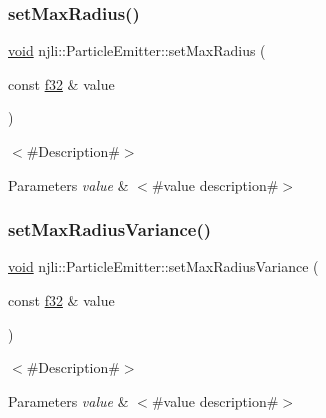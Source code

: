 \subsubsection{\texorpdfstring{set\+Max\+Radius()}{setMaxRadius()}}
{\footnotesize\ttfamily \mbox{\hyperlink{_thread_8h_af1e856da2e658414cb2456cb6f7ebc66}{void}} njli\+::\+Particle\+Emitter\+::set\+Max\+Radius (\begin{DoxyParamCaption}\item[{const \mbox{\hyperlink{_util_8h_a5f6906312a689f27d70e9d086649d3fd}{f32}} \&}]{value }\end{DoxyParamCaption})}

$<$\#\+Description\#$>$


\begin{DoxyParams}{Parameters}
{\em value} & $<$\#value description\#$>$ \\
\hline
\end{DoxyParams}
\mbox{\label{classnjli_1_1_particle_emitter_acaebc8c8b81d8cf62ad30463c68f4a8c}} 
\subsubsection{\texorpdfstring{set\+Max\+Radius\+Variance()}{setMaxRadiusVariance()}}
{\footnotesize\ttfamily \mbox{\hyperlink{_thread_8h_af1e856da2e658414cb2456cb6f7ebc66}{void}} njli\+::\+Particle\+Emitter\+::set\+Max\+Radius\+Variance (\begin{DoxyParamCaption}\item[{const \mbox{\hyperlink{_util_8h_a5f6906312a689f27d70e9d086649d3fd}{f32}} \&}]{value }\end{DoxyParamCaption})}

$<$\#\+Description\#$>$


\begin{DoxyParams}{Parameters}
{\em value} & $<$\#value description\#$>$ \\
\hline
\end{DoxyParams}
\mbox{\label{classnjli_1_1_particle_emitter_af2524c76c57fa8b5f6246199ad8fa927}} 
